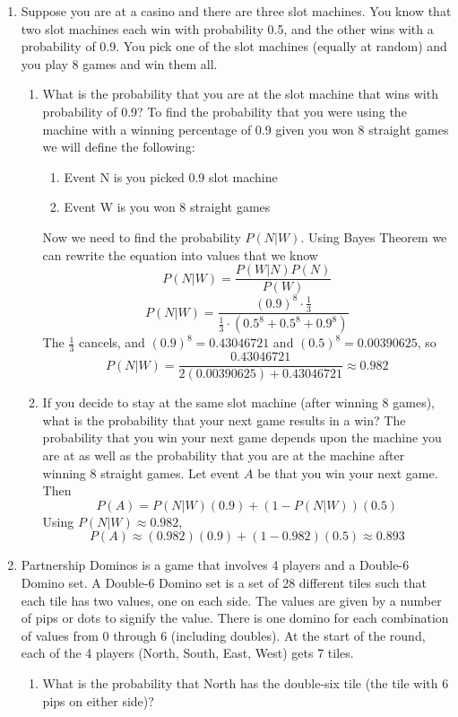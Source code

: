 \documentclass{article}
\begin{document}
\begin{enumerate}
\begin{enumerate}
    \end{enumerate}
    \item Suppose you are at a casino and there are three slot machines. You know that two slot
    machines each win with probability 0.5, and the other wins with a probability of 0.9.
    You pick one of the slot machines (equally at random) and you play 8 games and win them all.
    \begin{enumerate}
        \item What is the probability that you are at the slot machine that wins with probability of 0.9?
        To find the probability that you were using the machine with a winning percentage of 0.9 given you won 8 straight games we will define the following:
        \begin{enumerate}
            \item Event N is you picked 0.9 slot machine
            \item Event W is you won 8 straight games
        \end{enumerate}
        Now we need to find the probability $P(N|W)$. Using Bayes Theorem we can rewrite the equation into values that we know
        \[ P(N|W) = \frac{P(W|N) P(N)}{P(W)} \]    
        \[ P(N|W) = \frac{(0.9)^8 \cdot \frac{1}{3}}{\frac{1}{3} \cdot (0.5^8 + 0.5^8 + 0.9^8)} \]
        The $\frac{1}{3}$ cancels, and $(0.9)^8 = 0.43046721$ and $(0.5)^8 = 0.00390625$, so
        \[
        P(N|W) = \frac{0.43046721}{2(0.00390625) + 0.43046721} \approx 0.982
        \]

        \item  If you decide to stay at the same slot machine (after winning 8 games), what is the probability that your next game results in a win?
        The probability that you win your next game depends upon the machine you are at as well as the probability that you are at the machine after winning 8 straight games.
        Let event $A$ be that you win your next game. Then
        \[P(A) = P(N|W)(0.9) + (1-P(N|W))(0.5)\]
        Using $P(N|W) \approx 0.982$,
        \[
        P(A) \approx (0.982)(0.9) + (1-0.982)(0.5) \approx 0.893
        \]

    \end{enumerate}

    \item Partnership Dominos is a game that involves 4 players and a Double-6 Domino set.
    A Double-6 Domino set is a set of 28 different tiles such that each tile has two values, one on each side. The values are given by a number of pips or dots to signify the value. There is one domino for each combination of values from 0 through 6 (including doubles).
    At the start of the round, each of the 4 players (North, South, East, West) gets 7 tiles.
    \begin{enumerate}
        \item What is the probability that North has the double-six tile (the tile with 6 pips on either side)?


\end{enumerate}
\end{enumerate}
\end{document}
